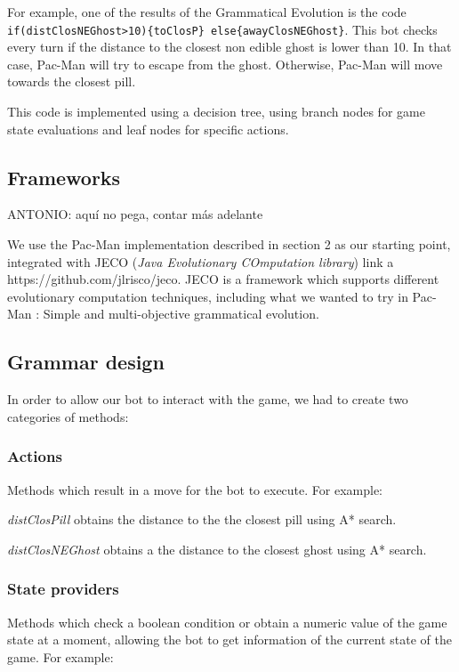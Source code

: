 \documentclass{llncs}
\newcommand{\paco}{Pac-Man }
\newcommand\menostab[1][-0.5cm]{\hspace*{#1}}
\begin{document}
For example, one of the results of the Grammatical Evolution is the code \texttt{if(distClosNEGhost>10)\{toClosP\} else\{awayClosNEGhost\}}. This bot checks every turn if the distance to the closest non edible ghost is lower than 10. In that case, \paco will try to escape from the ghost. Otherwise, \paco will move towards the closest pill.

This code is implemented using a decision tree, using branch nodes for game state evaluations and leaf nodes for specific actions.

\subsection{Frameworks}

{\color{red}ANTONIO: aquí no pega, contar más adelante}

We use the \paco implementation described in section 2 as our starting point, integrated with JECO (\textit{Java Evolutionary COmputation library}) {\color{red} link a https://github.com/jlrisco/jeco}. JECO is a framework which supports different evolutionary computation techniques, including what we wanted to try in \paco: Simple and multi-objective grammatical evolution.


\subsection{Grammar design}

In order to allow our bot to interact with the game, we had to create two categories of methods:

\subsubsection{Actions}
Methods which result in a move for the bot to execute. For example:\newline

\menostab\textit{distClosPill} obtains the distance to the the closest pill using A* search.

\menostab\textit{distClosNEGhost} obtains a the distance to the closest ghost using A* search.

\subsubsection{State providers}
Methods which check a boolean condition or obtain a numeric value of the game state at a moment, allowing the bot to get information of the current state of the game. For example:\newline
\end{document}
